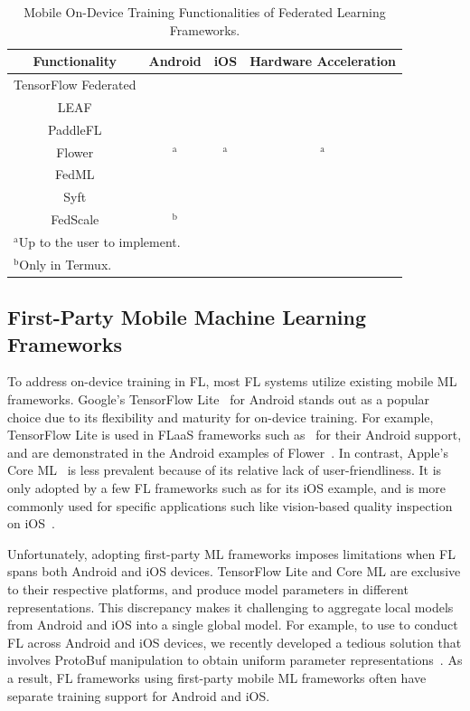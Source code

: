 \documentclass[conference]{IEEEtran}
\newcommand{\cmark}{\ding{51}}
\newcommand{\xmark}{\ding{55}}
\begin{document}
\begin{table}
\caption{Mobile On-Device Training Functionalities of
    Federated Learning Frameworks.
}
\begin{center}
\begin{tabular}{cccc}
    Functionality&Android&iOS&Hardware Acceleration\\
    \hline
    TensorFlow Federated&\xmark&\xmark&\xmark\\
    LEAF&\xmark&\xmark&\xmark\\
    PaddleFL&\xmark&\xmark&\xmark\\
    Flower&\cmark$^\mathrm{a}$&\cmark$^\mathrm{a}$&\cmark$^\mathrm{a}$\\
    FedML&\cmark&\xmark&\cmark\\
    Syft&\cmark&\cmark&\xmark\\
    FedScale&\cmark$^\mathrm{b}$&\xmark&\cmark\\
    \multicolumn{4}{l}{$^{\mathrm{a}}$Up to the user to implement.}\\
    \multicolumn{4}{l}{$^{\mathrm{b}}$Only in Termux.}
\end{tabular}
\label{tab:on-device}
\end{center}
\end{table}
\subsection{First-Party Mobile Machine Learning Frameworks}

To address on-device training in FL,
most FL systems utilize existing mobile ML frameworks.
Google's TensorFlow Lite~\cite{tensorflow2015-whitepaper,abadi2016tensorflow}
for Android stands out as
a popular choice due to its flexibility and
maturity for on-device training.
For example, TensorFlow Lite is used in FLaaS frameworks such as~\cite{
    kourtellis2020flaas,katevas2022flaas}
for their Android support,
and are demonstrated in the Android examples of
Flower~\cite{beutel2020flower,mathur2021ondevice}.
In contrast, Apple's Core ML~\cite{coreml} is less prevalent because of
its relative lack of user-friendliness.
It is only adopted by a few FL frameworks such as
\Flower{} for its iOS example,
and is more commonly used for specific applications
such like vision-based quality inspection on iOS~\cite{bharti2022edge}.

Unfortunately, adopting first-party ML frameworks imposes limitations when
FL spans both Android and iOS devices.
TensorFlow Lite and Core ML are exclusive to their respective platforms,
and produce model parameters in different representations.
This discrepancy makes it challenging to aggregate local models from
Android and iOS into a single global model.
For example, to use \Flower{} to conduct FL across Android and iOS devices,
we recently developed a tedious solution that involves
ProtoBuf manipulation to obtain uniform parameter
representations~\cite{he2023fedkit}.
As a result,
FL frameworks using first-party mobile ML frameworks often have
separate training support for Android and iOS.
\end{document}
